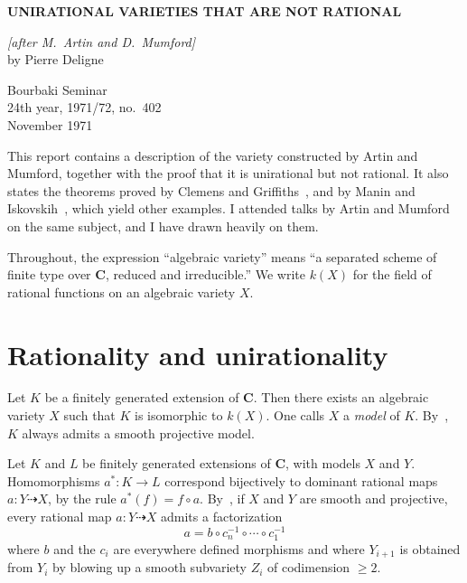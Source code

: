 \documentclass[12pt]{amsart}
\theoremstyle{plain}
\theoremstyle{definition}
\theoremstyle{remark}
\begin{document}
\begin{center}
{\Large \textbf{UNIRATIONAL VARIETIES THAT ARE NOT RATIONAL}}
\end{center}

\begin{flushright}
\textit{[after M.~Artin and D.~Mumford]}\\[4pt]
by Pierre Deligne
\end{flushright}

\begin{flushright}
Bourbaki Seminar\\
24th year, 1971/72, no.~402\\
November 1971
\end{flushright}

\bigskip

This report contains a description of the variety constructed by Artin and
Mumford, together with the proof that it is unirational but not rational.
It also states the theorems proved by Clemens and Griffiths~\cite{4}, and by
Manin and Iskovskih~\cite{6}, which yield other examples. I attended talks by
Artin and Mumford on the same subject, and I have drawn heavily on them.

Throughout, the expression ``algebraic variety'' means ``a separated scheme of
finite type over $\mathbf{C}$, reduced and irreducible.'' We write $k(X)$ for the
field of rational functions on an algebraic variety $X$.

\section{Rationality and unirationality}

Let $K$ be a finitely generated extension of $\mathbf{C}$. Then there exists an
algebraic variety $X$ such that $K$ is isomorphic to $k(X)$. One calls $X$ a
\emph{model} of $K$. By~\cite{5}, $K$ always admits a smooth projective model.

Let $K$ and $L$ be finitely generated extensions of $\mathbf{C}$, with models
$X$ and $Y$. Homomorphisms $a^*\colon K\to L$ correspond bijectively to
dominant rational maps $a\colon Y\dashrightarrow X$, by the rule
$a^*(f)=f\circ a$. By~\cite{5}, if $X$ and $Y$ are smooth and projective, every
rational map $a\colon Y\dashrightarrow X$ admits a factorization
\begin{equation}\label{eq:1.1}
a=b\circ c_n^{-1}\circ\cdots\circ c_1^{-1}
\end{equation}
where $b$ and the $c_i$ are everywhere defined morphisms and where $Y_{i+1}$ is
obtained from $Y_i$ by blowing up a smooth subvariety $Z_i$ of codimension
$\geqslant 2$.
\end{document}
